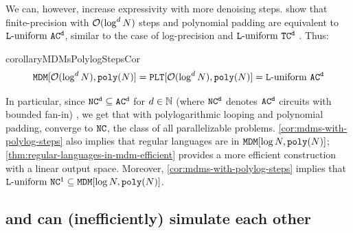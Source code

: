 \documentclass{article} %
\begin{document}
We can, however, increase expressivity with more denoising steps.
\citet{svete2025exactexpressivepowerfiniteprecision} show that finite-precision \LTsAcr with ${{{{\mathcal{O}}}(\log^d {{N}})}}$ steps and polynomial padding are equivalent to ${{\mathtt{L}}\textnormal{-uniform}} \ {{{{{{\mathtt{AC}}}^{\mathtt{d}}}}}}$, similar to the case of log-precision \LTsAcr and ${{\mathtt{L}}\textnormal{-uniform}} \ {{{{{{\mathtt{TC}}}^{\mathtt{d}}}}}}$ \citep{merrill2025exactexpressivepowertransformers}.
Thus:
\begin{restatable}{corollary}{MDMsPolylogStepsCor} \label{cor:mdms-with-polylog-steps}
   \begin{equation}
      \MDMClassEdit[\bigOFun{\log^d \strlen}, \polyFun{\strlen}] = \LTClass[\bigOFun{\log^d \strlen}, \polyFun{\strlen}] = \LUniform \ \ACd
   \end{equation}
\end{restatable}
In particular, since ${{{{\mathtt{NC}}}^{\mathtt{d}}}} \subseteq {{{{\mathtt{AC}}}^{\mathtt{d}}}}$ for $d \in {{\mathbb{N}}}$ (where ${{{{\mathtt{NC}}}^{\mathtt{d}}}}$ denotes ${{{{{{\mathtt{AC}}}^{\mathtt{d}}}}}}$ circuits with bounded fan-in) \citep{Vollmer1999}, we get that with polylogarithmic looping and polynomial padding, \MDMsAcr converge to ${{\mathtt{NC}}}$, the class of all parallelizable problems.
\cref{cor:mdms-with-polylog-steps} also implies that regular languages are in $\MDMClassEdit[\log \strlen, \polyFun{\strlen}]$; \cref{thm:regular-languages-in-mdm-efficient} provides a more efficient construction with a linear output space.
Moreover, \cref{cor:mdms-with-polylog-steps} implies that $\LUniform \ \NCOne \subseteq \MDMClassEdit[\log \strlen, \polyFun{\strlen}]$.

\subsection{\MDMsAcr and \CoTAcr can (inefficiently) simulate each other} \label{sec:mdms-and-cot}  
\end{document}
